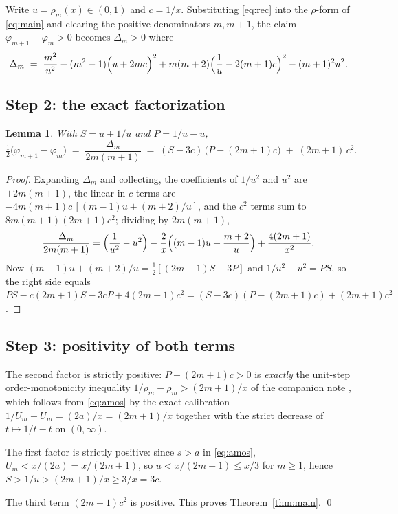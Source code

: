 \documentclass[11pt]{article}
\newtheorem{lemma}[theorem]{Lemma}
\theoremstyle{remark}
\begin{document}
Write $u = \rho_m(x) \in (0,1)$ and $c = 1/x$. Substituting
\eqref{eq:rec} into the $\rho$-form of \eqref{eq:main} and clearing
the positive denominators $m, m+1$, the claim
$\varphi_{m+1} - \varphi_m > 0$ becomes $\Delta_m > 0$ where
\[
\Delta_m \;=\;
\frac{m^2}{u^2} - (m^2-1)\Bigl(u + 2mc\Bigr)^2
+ m(m+2)\Bigl(\frac1u - 2(m+1)c\Bigr)^2 - (m+1)^2 u^2 .
\]

\subsection*{Step 2: the exact factorization}

\begin{lemma}
\label{lem:factor}
With $S = u + 1/u$ and $P = 1/u - u$,
\[
\tfrac12\bigl(\varphi_{m+1}-\varphi_m\bigr)
\;=\; \frac{\Delta_m}{2m(m+1)}
\;=\; (S - 3c)\,\bigl(P - (2m+1)c\bigr) \;+\; (2m+1)\,c^2 .
\]
\end{lemma}

\begin{proof}
Expanding $\Delta_m$ and collecting, the coefficients of $1/u^2$ and
$u^2$ are $\pm 2m(m+1)$, the linear-in-$c$ terms are
$-4m(m+1)c\,[(m-1)u + (m+2)/u]$, and the $c^2$ terms sum to
$8m(m+1)(2m+1)c^2$; dividing by $2m(m+1)$,
\[
\frac{\Delta_m}{2m(m+1)} = \Bigl(\frac{1}{u^2} - u^2\Bigr)
- \frac{2}{x}\Bigl((m-1)u + \frac{m+2}{u}\Bigr)
+ \frac{4(2m+1)}{x^2}.
\]
Now $(m-1)u + (m+2)/u = \tfrac12[(2m+1)S + 3P]$ and
$1/u^2 - u^2 = PS$, so the right side equals
$PS - c(2m+1)S - 3cP + 4(2m+1)c^2
= (S-3c)(P-(2m+1)c) + (2m+1)c^2$.
\end{proof}

\subsection*{Step 3: positivity of both terms}

The second factor is strictly positive: $P - (2m+1)c > 0$ is
\emph{exactly} the unit-step order-monotonicity inequality
$1/\rho_m - \rho_m > (2m+1)/x$ of the companion note
\cite{Companion}, which follows from \eqref{eq:amos} by the exact
calibration $1/U_m - U_m = (2a)/x = (2m+1)/x$ together with the
strict decrease of $t \mapsto 1/t - t$ on $(0,\infty)$.

The first factor is strictly positive: since $s > a$ in
\eqref{eq:amos}, $U_m < x/(2a) = x/(2m+1)$, so
$u < x/(2m+1) \le x/3$ for $m \ge 1$, hence
$S > 1/u > (2m+1)/x \ge 3/x = 3c$.

The third term $(2m+1)c^2$ is positive. This proves
Theorem~\ref{thm:main}. \qed
\end{document}
